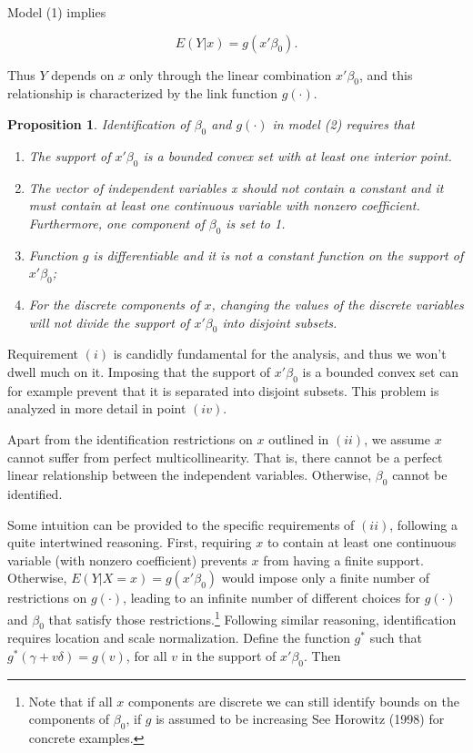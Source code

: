 \documentclass[a4paper]{article}
\begin{document}
Model (1) implies

\begin{equation}
E(Y|x) = g(x'\beta_0).
\end{equation}

Thus $Y$ depends on $x$ only through the linear combination $x'\beta_0$, and this relationship is characterized by the link function $g(\cdot)$. 


\newtheorem{prop}{Proposition}[section]

\begin{prop}
Identification of $\beta_0$ and $g(\cdot)$ in model (2) requires that
\begin{enumerate}[label=(\roman*)]
\item The support of $x'\beta_0$ is a bounded convex set with at least one interior point. 
\item The vector of independent variables x should not contain a constant and it must contain at least one continuous variable with nonzero coefficient. Furthermore, one component of $\beta_0$ is set to 1. 
\item Function $g$ is differentiable and it is not a constant function on the support of $x'\beta_0$;
\item For the discrete components of $x$, changing the values of the discrete variables will not divide the support of $x'\beta_0$ into disjoint subsets.
\end{enumerate}
\end{prop}

Requirement $(i)$ is candidly fundamental for the analysis, and thus we won't dwell much on it. Imposing that the support of $x'\beta_0$ is a bounded convex set can for example prevent that it is separated into disjoint subsets. This problem is analyzed in more detail in point $(iv)$.

Apart from the identification restrictions on $x$ outlined in $(ii)$, we assume $x$ cannot suffer from perfect multicollinearity. That is, there cannot be a perfect linear relationship between the independent variables. Otherwise, $\beta_0$ cannot be identified.

Some intuition can be provided to the specific requirements of $(ii)$, following a quite intertwined reasoning. First, requiring $x$ to contain at least one continuous variable (with nonzero coefficient) prevents $x$ from having a finite support. Otherwise, $E(Y|X = x) = g(x'\beta_0)$ would impose only a finite number of restrictions on $g(\cdot)$, leading to an infinite number of different choices for $g(\cdot)$ and $\beta_0$ that satisfy those restrictions.\footnote{Note that if all $x$ components are discrete we can still identify bounds on the components of $\beta_0$, if $g$ is assumed to be increasing See Horowitz (1998) \cite{[13]} for  concrete examples.} Following similar reasoning, identification requires location and scale normalization. Define the function $g^{*}$ such that $g^{*}(\gamma + v\delta) = g(v)$, for all $v$ in the support of $x'\beta_0$. Then
\end{document}
